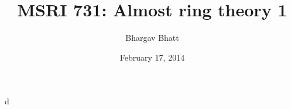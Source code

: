 \documentclass{article}
\title{MSRI 731: Almost ring theory 1}
\author{Bhargav Bhatt}
\date{February 17, 2014}
\begin{document}
\maketitle





d
\end{document}
